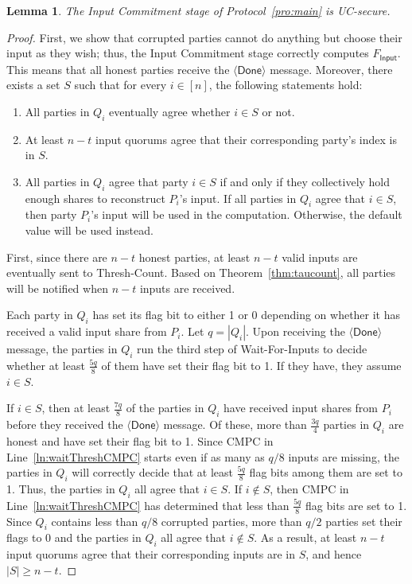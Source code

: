 \documentclass[11pt,letter]{article}
\newcommand{\alg}[1]{\mbox{\textsf{#1}}}
\newcommand{\func}[1]{\mbox{$F_\textsf{#1}$}}
\theoremstyle{mytheoremstyle}
\newtheorem{lemma}{Lemma}
\newcommand{\fbadq}{$q/8$\xspace}
\newcommand{\fgoodqq}{$\frac{7q}{8}$\xspace}
\newcommand{\threshq}{$\frac{5q}{8}$\xspace}
\newcommand{\done}{$\langle\mathsf{Done}\rangle$\xspace}
\newcommand{\hw}{\mbox{\textsf{CMPC}}\xspace}
\begin{document}
\begin{lemma} \label{lem:inputuc}
	The Input Commitment stage of Protocol~\ref{pro:main} is UC-secure.
\end{lemma}
\begin{proof}
	First, we show that corrupted parties cannot do anything but choose their input as they wish; thus, the Input Commitment stage correctly computes \func{Input}. This means that all honest parties receive the $\mbox{\done}$ message. Moreover, there exists a set $S$ such that for every $i \in [n]$, the following statements hold:
	\begin{enumerate}
		\item All parties in $Q_i$ eventually agree whether $i \in S$ or not.
		
		\item At least $n-t$ input quorums agree that their corresponding party's index is in $S$.
		
		\item All parties in $Q_i$ agree that party $i \in S$ if and only if they collectively hold enough shares to reconstruct $P_i$'s input. If all parties in $Q_i$ agree that $i \in S$, then party $P_i$'s input will be used in the computation. Otherwise, the default value will be used instead.
	\end{enumerate}

	First, since there are $n-t$ honest parties, at least $n-t$ valid inputs are eventually sent to \alg{Thresh-Count}. Based on Theorem~\ref{thm:taucount}, all parties will be notified when $n-t$ inputs are received.
	
	Each party in $Q_i$ has set its flag bit to either 1 or 0 depending on whether it has received a valid input share from $P_i$. Let $q = |Q_i|$. Upon receiving the \done message, the parties in $Q_i$ run the third step of \alg{Wait-For-Inputs} to decide whether at least \threshq of them have set their flag bit to 1. If they have, they assume $i \in S$.
	
	If $i \in S$, then at least \fgoodqq of the parties in $Q_i$ have received input shares from $P_i$ before they received the \done message. Of these, more than $\frac{3q}{4}$ parties in $Q_i$ are honest and have set their flag bit to 1. Since \hw in Line~\ref{ln:waitThreshCMPC}  starts even if as many as \fbadq inputs are missing, the parties in $Q_i$ will correctly decide that at least \threshq flag bits among them are set to 1. Thus, the parties in $Q_i$ all agree that $i \in S$.
	If $i \notin S$, then \hw in Line~\ref{ln:waitThreshCMPC} has determined that less than \threshq flag bits are set to 1. Since $Q_i$ contains less than \fbadq corrupted parties, more than $q/2$ parties set their flags to 0 and the parties in $Q_i$ all agree that $i \notin S$. As a result, at least $n-t$ input quorums agree that their corresponding inputs are in $S$, and hence $|S| \ge n-t$.




\end{proof}
\end{document}
